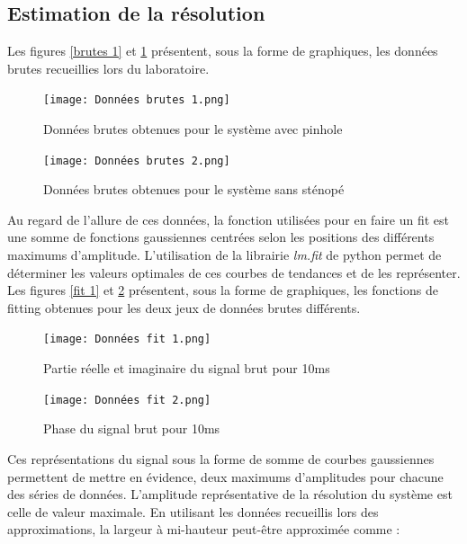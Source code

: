 \documentclass[11pt,letterpaper]{article}
\begin{document}
\subsection{Estimation de la résolution}

Les figures \ref{brutes 1} et \ref{brutes 2} présentent, sous la forme de graphiques, les données brutes recueillies lors du laboratoire. 

\begin{figure}[h!]
    \centering
    \begin{minipage}[t]{0.46\linewidth}
        \centering
        \texttt{[image: Données brutes 1.png]}
        \caption{Données brutes obtenues pour le système avec pinhole}
        \label{brutes 1}
    \end{minipage}\hfill
    \begin{minipage}[t]{0.5\linewidth}
        \centering
        \texttt{[image: Données brutes 2.png]}
        \caption{Données brutes obtenues pour le système sans sténopé}
        \label{brutes 2}
    \end{minipage}

\end{figure}

Au regard de l'allure de ces données, la fonction utilisées pour en faire un fit est une somme de fonctions gaussiennes centrées selon les positions des différents maximums d'amplitude. L'utilisation de la librairie \textit{lm.fit} de python permet de déterminer les valeurs optimales de ces courbes de tendances et de les représenter. Les figures \ref{fit 1} et \ref{fit 2} présentent, sous la forme de graphiques, les fonctions de fitting obtenues pour les deux jeux de données brutes différents. 

\begin{figure}[h!]
    \centering
    \begin{minipage}[t]{0.46\linewidth}
        \centering
        \texttt{[image: Données fit 1.png]}
        \caption{Partie réelle et imaginaire du signal brut pour 10ms}
        \label{fit 1}
    \end{minipage}\hfill
    \begin{minipage}[t]{0.5\linewidth}
        \centering
        \texttt{[image: Données fit 2.png]}
        \caption{Phase du signal brut pour 10ms}
        \label{fit 2}
    \end{minipage}
\end{figure}

Ces représentations du signal sous la forme de somme de courbes gaussiennes permettent de mettre en évidence, deux maximums d'amplitudes pour chacune des séries de données. L'amplitude représentative de la résolution du système est celle de valeur maximale. En utilisant les données recueillis lors des approximations, la largeur à mi-hauteur peut-être approximée comme :
\end{document}
